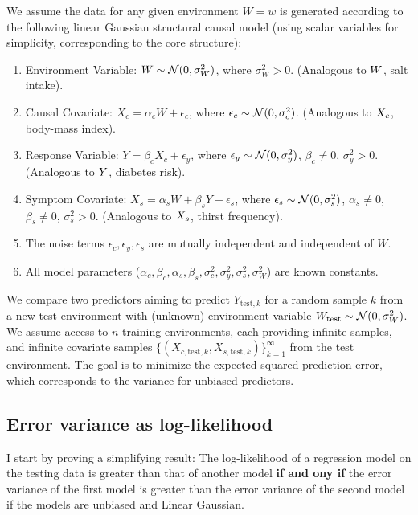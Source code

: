 \documentclass[../thesis.tex]{subfiles}
\begin{document}
\begin{assumption}
\label{ass:linear-gaussian-model}
We assume the data for any given environment $W=w$ is generated according to the following linear Gaussian structural causal model (using scalar variables for simplicity, corresponding to the core structure):
\begin{enumerate}
    \item Environment Variable: $W \sim \mathcal{N}(0, \sigma_W^2)$, where $\sigma_W^2 > 0$. (Analogous to $\myrv{w}$, salt intake).
    \item Causal Covariate: $X_c = \alpha_c W + \epsilon_c$, where $\epsilon_c \sim \mathcal{N}(0, \sigma_c^2)$. (Analogous to $\myrv{x}_c$, body-mass index).
    \item Response Variable: $Y = \beta_c X_c + \epsilon_y$, where $\epsilon_y \sim \mathcal{N}(0, \sigma_y^2)$, $\beta_c \neq 0$, $\sigma_y^2 > 0$. (Analogous to $\myrv{y}$, diabetes risk).
    \item Symptom Covariate: $X_s = \alpha_s W + \beta_s Y + \epsilon_s$, where $\epsilon_s \sim \mathcal{N}(0, \sigma_s^2)$, $\alpha_s \neq 0$, $\beta_s \neq 0$, $\sigma_s^2 > 0$. (Analogous to $\myrv{x}_s$, thirst frequency).
    \item The noise terms $\epsilon_c, \epsilon_y, \epsilon_s$ are mutually independent and independent of $W$.
    \item All model parameters ($\alpha_c, \beta_c, \alpha_s, \beta_s, \sigma_c^2, \sigma_y^2, \sigma_s^2, \sigma_W^2$) are known constants.
\end{enumerate}
\end{assumption}

We compare two predictors aiming to predict $Y_{\text{test},k}$ for a random sample $k$ from a new test environment with (unknown) environment variable $W_{\text{test}} \sim \mathcal{N}(0, \sigma_W^2)$. We assume access to $n$ training environments, each providing infinite samples, and infinite covariate samples $\{ (X_{c,\text{test},k}, X_{s,\text{test},k}) \}_{k=1}^\infty$ from the test environment. The goal is to minimize the expected squared prediction error, which corresponds to the variance for unbiased predictors.

\subsection{Error variance as log-likelihood}

I start by proving a simplifying result: The log-likelihood of a regression model on the testing data is greater than that of another model \textbf{if and ony if} the error variance of the first model is greater than the error variance of the second model if the models are unbiased and Linear Gaussian.
\end{document}
